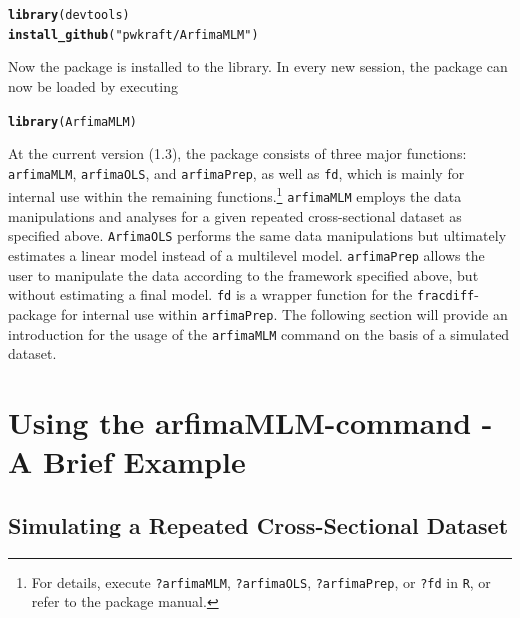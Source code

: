 \documentclass[12pt]{paper}\usepackage[]{graphicx}\usepackage[]{color}
\makeatletter
\newcommand{\hlstr}[1]{\textcolor[rgb]{0.192,0.494,0.8}{#1}}%
\newcommand{\hlstd}[1]{\textcolor[rgb]{0.345,0.345,0.345}{#1}}%
\newcommand{\hlkwd}[1]{\textcolor[rgb]{0.737,0.353,0.396}{\textbf{#1}}}%
\newenvironment{kframe}{%
 \def\at@end@of@kframe{}%
 \ifinner\ifhmode%
  \def\at@end@of@kframe{\end{minipage}}%
  \begin{minipage}{\columnwidth}%
 \fi\fi%
 \def\FrameCommand##1{\hskip\@totalleftmargin \hskip-\fboxsep
 \colorbox{shadecolor}{##1}\hskip-\fboxsep
     \hskip-\linewidth \hskip-\@totalleftmargin \hskip\columnwidth}%
 \MakeFramed {\advance\hsize-\width
   \@totalleftmargin\z@ \linewidth\hsize
   \@setminipage}}%
 {\par\unskip\endMakeFramed%
 \at@end@of@kframe}
\newenvironment{knitrout}{}{} %
\makeatother
\begin{document}
\begin{knitrout}
\color{fgcolor}\begin{kframe}
\begin{alltt}
\hlkwd{library}\hlstd{(devtools)}
\hlkwd{install_github}\hlstd{(}\hlstr{"pwkraft/ArfimaMLM"}\hlstd{)}
\end{alltt}
\end{kframe}
\end{knitrout}

\noindent Now the package is installed to the library. In every new session, the package can now be loaded by executing

\begin{knitrout}
\color{fgcolor}\begin{kframe}
\begin{alltt}
\hlkwd{library}\hlstd{(ArfimaMLM)}
\end{alltt}
\end{kframe}
\end{knitrout}

At the current version (1.3), the package consists of three major functions: \texttt{arfimaMLM}, \texttt{arfimaOLS}, and \texttt{arfimaPrep}, as well as \texttt{fd}, which is mainly for internal use within the remaining functions.\footnote{For details, execute \texttt{?arfimaMLM}, \texttt{?arfimaOLS}, \texttt{?arfimaPrep}, or \texttt{?fd} in \texttt{R}, or refer to the package manual.} \texttt{arfimaMLM} employs the data manipulations and analyses for a given repeated cross-sectional dataset as specified above. \texttt{ArfimaOLS} performs the same data manipulations but ultimately estimates a linear model instead of a multilevel model. \texttt{arfimaPrep} allows the user to manipulate the data according to the framework specified above, but without estimating a final model. \texttt{fd} is a wrapper function for the \texttt{fracdiff}-package for internal use within \texttt{arfimaPrep}. The following section will provide an introduction for the usage of the \texttt{arfimaMLM} command on the basis of a simulated dataset.


\section{Using the arfimaMLM-command - A Brief Example}

\subsection{Simulating a Repeated Cross-Sectional Dataset}
\end{document}
